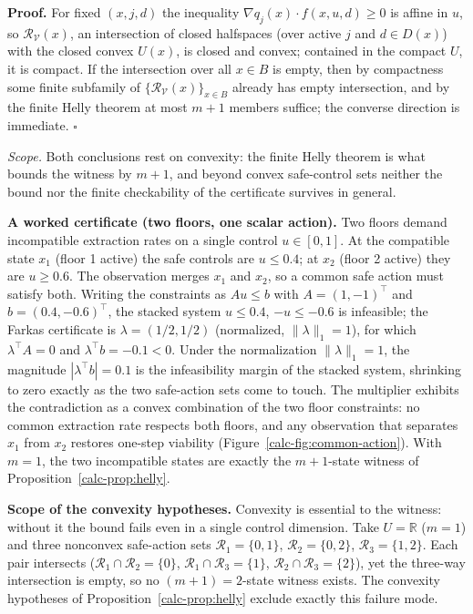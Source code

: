 \documentclass[10pt,twocolumn]{article}
\theoremstyle{definition}
\begin{document}
\textbf{Proof.} For fixed \((x,j,d)\) the inequality
\(\nabla q_j(x)\cdot f(x,u,d)\ge 0\) is affine in \(u\), so
\(\mathcal R_{\mathcal V}(x)\), an intersection of closed halfspaces
(over active \(j\) and \(d\in D(x)\)) with the closed convex \(U(x)\),
is closed and convex; contained in the compact \(U\), it is compact. If
the intersection over all \(x\in B\) is empty, then by compactness some
finite subfamily of \(\{\mathcal R_{\mathcal V}(x)\}_{x\in B}\) already
has empty intersection, and by the finite Helly theorem at most \(m+1\)
members suffice; the converse direction is immediate. \hfill\(\square\)

\emph{Scope.} Both conclusions rest on convexity: the finite Helly theorem is what bounds the witness by \(m+1\), and beyond convex safe-control sets neither the bound nor the finite checkability of the certificate survives in general.

\textbf{A worked certificate (two floors, one scalar action).} Two
floors demand incompatible extraction rates on a single control
\(u\in[0,1]\). At the compatible state \(x_1\) (floor 1 active) the safe
controls are \(u\le 0.4\); at \(x_2\) (floor 2 active) they are
\(u\ge 0.6\). The observation merges \(x_1\) and \(x_2\), so a common
safe action must satisfy both. Writing the constraints as \(Au\le b\)
with \(A=(1,-1)^{\top}\) and \(b=(0.4,-0.6)^{\top}\), the stacked system
\(u\le 0.4\), \(-u\le -0.6\) is infeasible; the Farkas certificate is
\(\lambda=(1/2,1/2)\) (normalized, \(\|\lambda\|_1=1\)), for which
\(\lambda^{\top}A=0\) and \(\lambda^{\top}b=-0.1<0\). Under the normalization
\(\|\lambda\|_1=1\), the magnitude \(|\lambda^{\top}b|=0.1\) is the
infeasibility margin of the stacked system, shrinking to zero exactly as
the two safe-action sets come to touch. The multiplier
exhibits the contradiction as a convex combination of the two floor
constraints: no common extraction rate respects both floors, and any
observation that separates \(x_1\) from \(x_2\) restores one-step
viability (Figure~\ref{calc-fig:common-action}). With \(m=1\), the two
incompatible states are exactly the \(m+1\)-state witness of
Proposition~\ref{calc-prop:helly}.

\textbf{Scope of the convexity hypotheses.} Convexity is essential to the witness: without it the bound fails even in a single control dimension. Take \(U=\mathbb R\) (\(m=1\)) and three nonconvex safe-action sets \(\mathcal R_1=\{0,1\}\), \(\mathcal R_2=\{0,2\}\), \(\mathcal R_3=\{1,2\}\). Each pair intersects (\(\mathcal R_1\cap\mathcal R_2=\{0\}\), \(\mathcal R_1\cap\mathcal R_3=\{1\}\), \(\mathcal R_2\cap\mathcal R_3=\{2\}\)), yet the three-way intersection is empty, so no \((m+1)=2\)-state witness exists. The convexity hypotheses of Proposition~\ref{calc-prop:helly} exclude exactly this failure mode.
\end{document}
